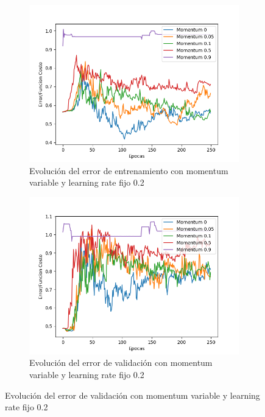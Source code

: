 \begin{figure}[!htbp]
\centering
\begin{subfigure}{.5\textwidth}
  \centering
  \includegraphics[width=1\linewidth]{graficos/eta_x_momentum_promedios_entrenamiento_0_2.png}
  \caption{Evolución del error de entrenamiento con momentum variable y learning rate fijo 0.2}
  \label{fig:sub1}
\end{subfigure}%
\begin{subfigure}{.5\textwidth}
  \centering
  \includegraphics[width=1\linewidth]{graficos/eta_x_momentum_promedios_validacion_0_2.png}
  \caption{Evolución del error de validación con momentum variable y learning rate fijo 0.2}
  \label{fig:sub2}
\end{subfigure}
\end{figure}

